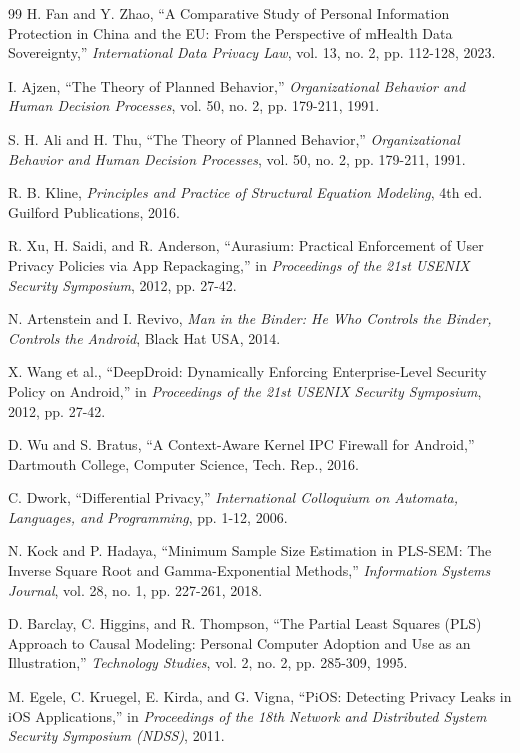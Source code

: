 \documentclass{article}
\begin{document}
\begin{thebibliography}{99}
 H. Fan and Y. Zhao, ``A Comparative Study of Personal Information Protection in China and the EU: From the Perspective of mHealth Data Sovereignty,'' \emph{International Data Privacy Law}, vol. 13, no. 2, pp. 112-128, 2023.

 I. Ajzen, ``The Theory of Planned Behavior,'' \emph{Organizational Behavior and Human Decision Processes}, vol. 50, no. 2, pp. 179-211, 1991.

 S. H. Ali and H. Thu, ``The Theory of Planned Behavior,'' \emph{Organizational Behavior and Human Decision Processes}, vol. 50, no. 2, pp. 179-211, 1991.

 R. B. Kline, \emph{Principles and Practice of Structural Equation Modeling}, 4th ed. Guilford Publications, 2016.

 R. Xu, H. Saidi, and R. Anderson, ``Aurasium: Practical Enforcement of User Privacy Policies via App Repackaging,'' in \emph{Proceedings of the 21st USENIX Security Symposium}, 2012, pp. 27-42.

 N. Artenstein and I. Revivo, \emph{Man in the Binder: He Who Controls the Binder, Controls the Android}, Black Hat USA, 2014.

 X. Wang et al., ``DeepDroid: Dynamically Enforcing Enterprise-Level Security Policy on Android,'' in \emph{Proceedings of the 21st USENIX Security Symposium}, 2012, pp. 27-42.

 D. Wu and S. Bratus, ``A Context-Aware Kernel IPC Firewall for Android,'' Dartmouth College, Computer Science, Tech. Rep., 2016.

 C. Dwork, ``Differential Privacy,'' \emph{International Colloquium on Automata, Languages, and Programming}, pp. 1-12, 2006.

 N. Kock and P. Hadaya, ``Minimum Sample Size Estimation in PLS-SEM: The Inverse Square Root and Gamma-Exponential Methods,'' \emph{Information Systems Journal}, vol. 28, no. 1, pp. 227-261, 2018.

 D. Barclay, C. Higgins, and R. Thompson, ``The Partial Least Squares (PLS) Approach to Causal Modeling: Personal Computer Adoption and Use as an Illustration,'' \emph{Technology Studies}, vol. 2, no. 2, pp. 285-309, 1995.

 M. Egele, C. Kruegel, E. Kirda, and G. Vigna, ``PiOS: Detecting Privacy Leaks in iOS Applications,'' in \emph{Proceedings of the 18th Network and Distributed System Security Symposium (NDSS)}, 2011.

\end{thebibliography}
\end{document}

